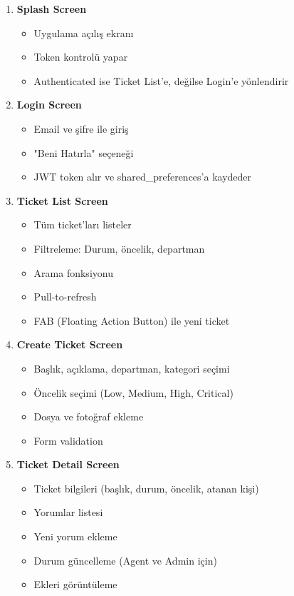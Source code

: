 \documentclass[12pt,a4paper]{article}
\begin{document}
\begin{enumerate}
    \item \textbf{Splash Screen}
    \begin{itemize}
        \item Uygulama açılış ekranı
        \item Token kontrolü yapar
        \item Authenticated ise Ticket List'e, değilse Login'e yönlendirir
    \end{itemize}
    
    \item \textbf{Login Screen}
    \begin{itemize}
        \item Email ve şifre ile giriş
        \item "Beni Hatırla" seçeneği
        \item JWT token alır ve shared\_preferences'a kaydeder
    \end{itemize}
    
    \item \textbf{Ticket List Screen}
    \begin{itemize}
        \item Tüm ticket'ları listeler
        \item Filtreleme: Durum, öncelik, departman
        \item Arama fonksiyonu
        \item Pull-to-refresh
        \item FAB (Floating Action Button) ile yeni ticket
    \end{itemize}
    
    \item \textbf{Create Ticket Screen}
    \begin{itemize}
        \item Başlık, açıklama, departman, kategori seçimi
        \item Öncelik seçimi (Low, Medium, High, Critical)
        \item Dosya ve fotoğraf ekleme
        \item Form validation
    \end{itemize}
    
    \item \textbf{Ticket Detail Screen}
    \begin{itemize}
        \item Ticket bilgileri (başlık, durum, öncelik, atanan kişi)
        \item Yorumlar listesi
        \item Yeni yorum ekleme
        \item Durum güncelleme (Agent ve Admin için)
        \item Ekleri görüntüleme
    \end{itemize}
    

\end{enumerate}
\end{document}
